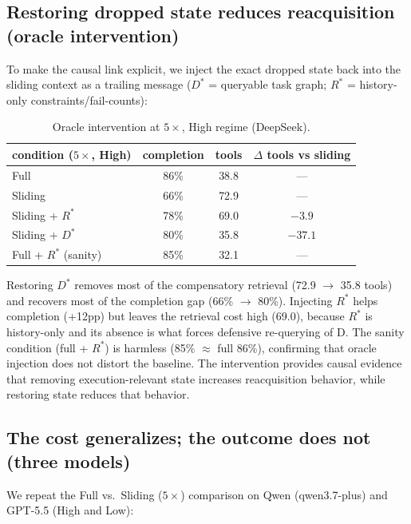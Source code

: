 \documentclass[11pt]{article}
\begin{document}
\subsection{Restoring dropped state reduces reacquisition (oracle intervention)}
\label{sec:oracle}

To make the causal link explicit, we inject the exact dropped state back into the sliding
context as a trailing message ($D^*$ = queryable task graph; $R^*$ = history-only
constraints/fail-counts):

\begin{table}[t]
\centering
\small
\caption{Oracle intervention at $5\times$, High regime (DeepSeek).}
\label{tab:oracle}
\begin{tabular}{@{}lccc@{}}
\toprule
condition ($5\times$, High) & completion & tools & $\Delta$ tools vs sliding \\
\midrule
Full & 86\% & 38.8 & --- \\
Sliding & 66\% & 72.9 & --- \\
Sliding + $R^*$ & 78\% & 69.0 & $-3.9$ \\
Sliding + $D^*$ & 80\% & 35.8 & \textbf{$-37.1$} \\
Full + $R^*$ (sanity) & 85\% & 32.1 & --- \\
\bottomrule
\end{tabular}
\end{table}

Restoring $D^*$ removes most of the compensatory retrieval (72.9 $\to$ 35.8 tools) and recovers
most of the completion gap (66\% $\to$ 80\%). Injecting $R^*$ helps completion (+12pp) but leaves
the retrieval cost high (69.0), because $R^*$ is history-only and its absence is what forces
defensive re-querying of D. The sanity condition (full + $R^*$) is harmless (85\% $\approx$ full
86\%), confirming that oracle injection does not distort the baseline.
The intervention provides causal evidence that removing execution-relevant state increases
reacquisition behavior, while restoring state reduces that behavior.

\subsection{The cost generalizes; the outcome does not (three models)}
\label{sec:models}

We repeat the Full vs.\ Sliding ($5\times$) comparison on Qwen (qwen3.7-plus) and GPT-5.5 (High and Low):
\end{document}
